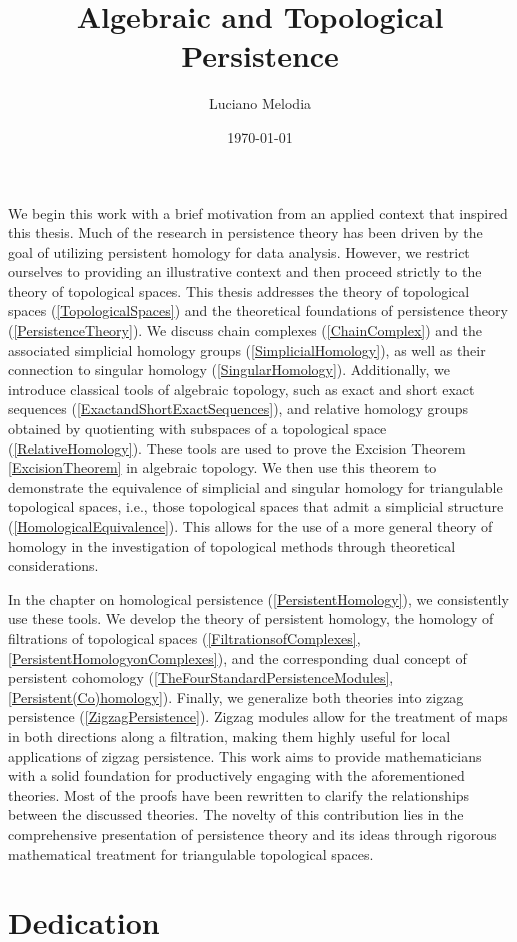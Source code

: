 \documentclass[b5paper, 12pt, twoside]{report}
\title{Algebraic and Topological Persistence}
\author{Luciano Melodia}
\date{\today}
\begin{document}
	
	
	We begin this work with a brief motivation from an applied context that inspired
	this thesis. Much of the research in persistence theory has been driven by the
	goal of utilizing persistent homology for data analysis. However, we restrict
	ourselves to providing an illustrative context and then proceed strictly to
	the theory of topological spaces. This thesis addresses the theory of topological
	spaces (\ref{TopologicalSpaces}) and the theoretical foundations of persistence
	theory (\ref{PersistenceTheory}). We discuss chain complexes (\ref{ChainComplex})
	and the associated simplicial homology groups (\ref{SimplicialHomology}), as well
	as their connection to singular homology (\ref{SingularHomology}).
	Additionally, we introduce classical tools of algebraic topology, such as
	exact and short exact sequences (\ref{ExactandShortExactSequences}), and relative
	homology groups obtained by quotienting with subspaces of a topological space (\ref{RelativeHomology}).
	These tools are used to prove the Excision Theorem \ref{ExcisionTheorem} in
	algebraic topology. We then use this theorem to demonstrate the equivalence of
	simplicial and singular homology for triangulable topological spaces, i.e.,
	those topological spaces that admit a simplicial structure (\ref{HomologicalEquivalence}).
	This allows for the use of a more general theory of homology in the investigation
	of topological methods through theoretical considerations.

	In the chapter on homological persistence (\ref{PersistentHomology}), we consistently use these tools. We develop the theory of persistent homology, the homology of filtrations of
	topological spaces (\ref{FiltrationsofComplexes}, \ref{PersistentHomologyonComplexes}), and the corresponding dual concept of persistent cohomology (\ref{TheFourStandardPersistenceModules}, \ref{Persistent(Co)homology}). Finally, we generalize both theories into zigzag persistence (\ref{ZigzagPersistence}). Zigzag modules allow for the treatment of maps in both directions along a filtration, making them highly useful for local applications of zigzag persistence. This work aims to provide mathematicians with a solid foundation for productively engaging with
	the aforementioned theories. Most of the proofs have been rewritten to clarify
	the relationships between the discussed theories. The novelty of this
	contribution lies in the comprehensive presentation of persistence theory and
	its ideas through rigorous mathematical treatment for triangulable topological
	spaces.
	\chapter*{Dedication}
\end{document}
